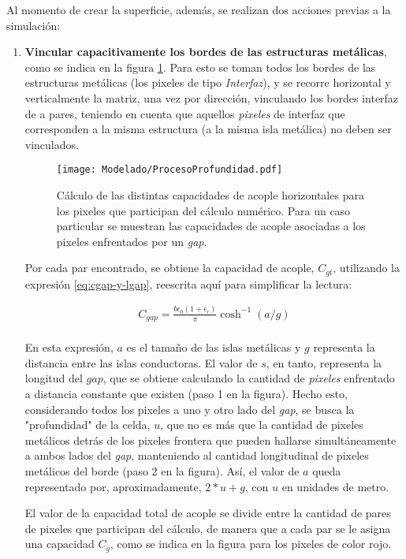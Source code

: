 Al momento de crear la superficie, además, se realizan dos acciones previas a la simulación:

\begin{enumerate}
	\item \textbf{Vincular capacitivamente los bordes de las estructuras metálicas}, como se indica en la figura \ref{fig:calculoCapacidadTLM}. Para esto se toman todos los bordes de las estructuras metálicas (los pixeles de tipo \textit{Interfaz}), y se recorre horizontal y verticalmente la matriz, una vez por dirección, vinculando los bordes interfaz de a pares, teniendo en cuenta que aquellos \textit{pixeles} de interfaz que corresponden a la misma estructura (a la misma isla metálica) no deben ser vinculados.
	
	\begin{figure}[h]
		\centering
		\texttt{[image: Modelado/ProcesoProfundidad.pdf]}
		\caption{Cálculo de las distintas capacidades de acople horizontales para los pixeles que participan del cálculo numérico. Para un caso particular se muestran las capacidades de acople asociadas a los pixeles enfrentados por un \textit{gap}.}
		\label{fig:calculoCapacidadTLM}
	\end{figure}
	
	Por cada par encontrado, se obtiene la capacidad de acople, $C_{gt}$, utilizando la expresión \ref{eq:cgap-y-lgap}, reescrita aquí para simplificar la lectura:
	
	\begin{align*}
		C_{gap} = \frac{b \epsilon_0 (1+\epsilon_r)}{\pi} \cosh^{-1} (a / g) \\
	\end{align*}
	
	En esta expresión, $a$ es el tamaño de las islas metálicas y $g$ representa la distancia entre las islas conductoras. El valor de $s$, en tanto, representa la longitud del $gap$, que se obtiene calculando la cantidad de \textit{pixeles} enfrentado a distancia constante que existen (paso 1 en la figura). Hecho esto, considerando todos los pixeles a uno y otro lado del \textit{gap}, se busca la "profundidad" de la celda, $u$, que no es más que la cantidad de pixeles metálicos detrás de los pixeles frontera que pueden hallarse simultáneamente a ambos lados del \textit{gap}, manteniendo al cantidad longitudinal de pixeles metálicos del borde (paso 2 en la figura). Así, el valor de $a$ queda representado por, aproximadamente, $2*u+g$, con $u$ en unidades de metro.
	
	El valor de la capacidad total de acople se divide entre la cantidad de pares de pixeles que participan del cálculo, de manera que a cada par se le asigna una capacidad $C_g$, como se indica en la figura para los pixeles de color rojo.
	

\end{enumerate}
